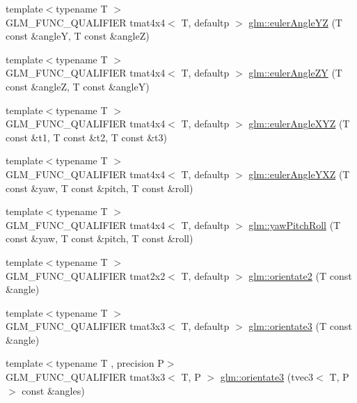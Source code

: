 \begin{DoxyCompactItemize}
\item 
{\footnotesize template$<$typename T $>$ }\\G\+L\+M\+\_\+\+F\+U\+N\+C\+\_\+\+Q\+U\+A\+L\+I\+F\+I\+E\+R tmat4x4$<$ T, defaultp $>$ \hyperlink{group__gtx__euler__angles_ga1033f84f51d61646145352ef0c1bb58c}{glm\+::euler\+Angle\+Y\+Z} (T const \&angle\+Y, T const \&angle\+Z)
\item 
{\footnotesize template$<$typename T $>$ }\\G\+L\+M\+\_\+\+F\+U\+N\+C\+\_\+\+Q\+U\+A\+L\+I\+F\+I\+E\+R tmat4x4$<$ T, defaultp $>$ \hyperlink{group__gtx__euler__angles_ga02f037926568bbd12dfece3b28b20343}{glm\+::euler\+Angle\+Z\+Y} (T const \&angle\+Z, T const \&angle\+Y)
\item 
{\footnotesize template$<$typename T $>$ }\\G\+L\+M\+\_\+\+F\+U\+N\+C\+\_\+\+Q\+U\+A\+L\+I\+F\+I\+E\+R tmat4x4$<$ T, defaultp $>$ \hyperlink{group__gtx__euler__angles_gaaedda1657a1aebe0a904d864b33844e8}{glm\+::euler\+Angle\+X\+Y\+Z} (T const \&t1, T const \&t2, T const \&t3)
\item 
{\footnotesize template$<$typename T $>$ }\\G\+L\+M\+\_\+\+F\+U\+N\+C\+\_\+\+Q\+U\+A\+L\+I\+F\+I\+E\+R tmat4x4$<$ T, defaultp $>$ \hyperlink{group__gtx__euler__angles_ga0242b5ab68651db70c6025815549427f}{glm\+::euler\+Angle\+Y\+X\+Z} (T const \&yaw, T const \&pitch, T const \&roll)
\item 
{\footnotesize template$<$typename T $>$ }\\G\+L\+M\+\_\+\+F\+U\+N\+C\+\_\+\+Q\+U\+A\+L\+I\+F\+I\+E\+R tmat4x4$<$ T, defaultp $>$ \hyperlink{group__gtx__euler__angles_gaf9c8d0f1df88c5344165600774489bc5}{glm\+::yaw\+Pitch\+Roll} (T const \&yaw, T const \&pitch, T const \&roll)
\item 
{\footnotesize template$<$typename T $>$ }\\G\+L\+M\+\_\+\+F\+U\+N\+C\+\_\+\+Q\+U\+A\+L\+I\+F\+I\+E\+R tmat2x2$<$ T, defaultp $>$ \hyperlink{group__gtx__euler__angles_ga6f465681cbbc575ad93a53ec918dacf3}{glm\+::orientate2} (T const \&angle)
\item 
{\footnotesize template$<$typename T $>$ }\\G\+L\+M\+\_\+\+F\+U\+N\+C\+\_\+\+Q\+U\+A\+L\+I\+F\+I\+E\+R tmat3x3$<$ T, defaultp $>$ \hyperlink{group__gtx__euler__angles_gab188e2526dea3c003e86e298f618085e}{glm\+::orientate3} (T const \&angle)
\item 
{\footnotesize template$<$typename T , precision P$>$ }\\G\+L\+M\+\_\+\+F\+U\+N\+C\+\_\+\+Q\+U\+A\+L\+I\+F\+I\+E\+R tmat3x3$<$ T, P $>$ \hyperlink{group__gtx__euler__angles_ga33f0d790cecd8337ee83f8e3a8109b11}{glm\+::orientate3} (tvec3$<$ T, P $>$ const \&angles)

\end{DoxyCompactItemize}
